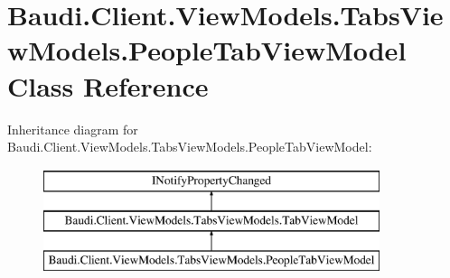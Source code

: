 \hypertarget{class_baudi_1_1_client_1_1_view_models_1_1_tabs_view_models_1_1_people_tab_view_model}{}\section{Baudi.\+Client.\+View\+Models.\+Tabs\+View\+Models.\+People\+Tab\+View\+Model Class Reference}
\label{class_baudi_1_1_client_1_1_view_models_1_1_tabs_view_models_1_1_people_tab_view_model}
Inheritance diagram for Baudi.\+Client.\+View\+Models.\+Tabs\+View\+Models.\+People\+Tab\+View\+Model\+:\begin{figure}[H]
\begin{center}
\leavevmode
\includegraphics[height=3.000000cm]{class_baudi_1_1_client_1_1_view_models_1_1_tabs_view_models_1_1_people_tab_view_model}
\end{center}
\end{figure}
